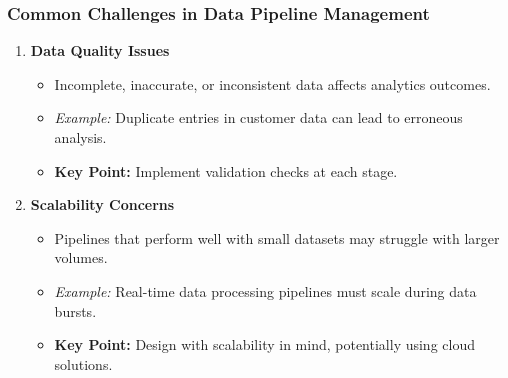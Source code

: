 \documentclass[aspectratio=169]{beamer}
\begin{document}
\begin{frame}[fragile]
    \frametitle{Common Challenges in Data Pipeline Management}
    \begin{enumerate}
        \item \textbf{Data Quality Issues}
            \begin{itemize}
                \item Incomplete, inaccurate, or inconsistent data affects analytics outcomes.
                \item \textit{Example:} Duplicate entries in customer data can lead to erroneous analysis.
                \item \textbf{Key Point:} Implement validation checks at each stage.
            \end{itemize}
        
        \item \textbf{Scalability Concerns}
            \begin{itemize}
                \item Pipelines that perform well with small datasets may struggle with larger volumes.
                \item \textit{Example:} Real-time data processing pipelines must scale during data bursts.
                \item \textbf{Key Point:} Design with scalability in mind, potentially using cloud solutions.
            \end{itemize}
    \end{enumerate}
\end{frame}
\end{document}
